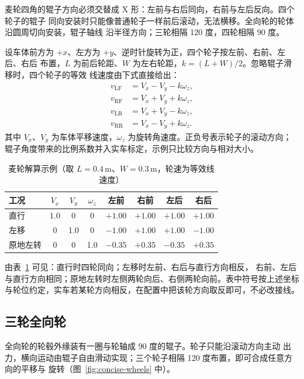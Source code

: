麦轮四角的辊子方向必须交替成 X 形：左前与右后同向，右前与左后反向。四个轮子的辊子
同向安装时只能像普通轮子一样前后滚动，无法横移。全向轮的轮体沿圆周切向安装，辊子轴线
沿半径方向；三轮相隔 120 度，四轮相隔 90 度。

设车体前方为 $+x$、左方为 $+y$、逆时针旋转为正，四个轮子按左前、右前、左后、右后
布置，$L$ 为前后轮距、$W$ 为左右轮距，$k=(L+W)/2$。忽略辊子滑移时，四个轮子的等效
线速度由下式直接给出：
\[
\begin{aligned}
v_{\mathrm{LF}} &= V_x - V_y - k\omega_z,\\
v_{\mathrm{RF}} &= V_x + V_y + k\omega_z,\\
v_{\mathrm{LR}} &= V_x + V_y - k\omega_z,\\
v_{\mathrm{RR}} &= V_x - V_y + k\omega_z.
\end{aligned}
\]
其中 $V_x$、$V_y$ 为车体平移速度，$\omega_z$ 为旋转角速度。正负号表示轮子的滚动方向；
辊子角度带来的比例系数并入实车标定，示例只比较方向与相对大小。

\begin{table}[htbp]
  \centering
  \small
  \setlength{\tabcolsep}{4pt}
  \begin{tabular}{@{}lccccccc@{}}
    \toprule
    工况 & $V_x$ & $V_y$ & $\omega_z$ & 左前 & 右前 & 左后 & 右后 \\
    \midrule
    直行 & 1.0 & 0 & 0 & $+1.00$ & $+1.00$ & $+1.00$ & $+1.00$ \\
    左移 & 0 & 1.0 & 0 & $-1.00$ & $+1.00$ & $+1.00$ & $-1.00$ \\
    原地左转 & 0 & 0 & 1.0 & $-0.35$ & $+0.35$ & $-0.35$ & $+0.35$ \\
    \bottomrule
  \end{tabular}
  \caption{麦轮解算示例（取 $L=0.4$\,m、$W=0.3$\,m，轮速为等效线速度）}
  \label{tab:concise-mecanum}
\end{table}

由表~\ref{tab:concise-mecanum} 可见：直行时四轮同向；左移时左前、右后与直行方向相反，
右前、左后与直行方向相同；原地左转时左侧两轮向后、右侧两轮向前。表中符号按上述坐标
与轮位约定，实车若某轮方向相反，在配置中把该轮方向取反即可，不必改接线。

\subsection{三轮全向轮}

全向轮的轮毂外缘装有一圈与轮轴成 90 度的辊子。轮子只能沿滚动方向主动
出力，横向运动由辊子自由滑动实现；三个轮子相隔 120 度布置，即可合成任意方向的平移与
旋转（图~\ref{fig:concise-wheels} 中）。

